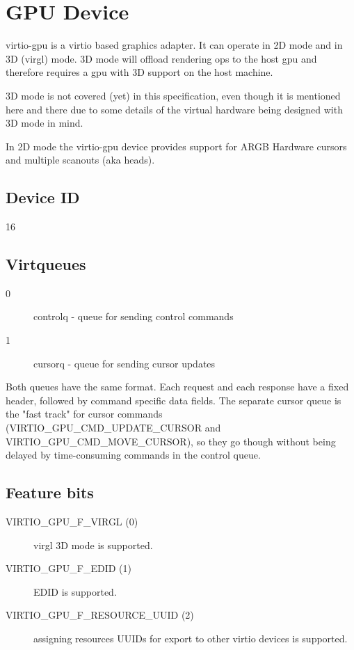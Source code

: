 \section{GPU Device}\label{sec:Device Types / GPU Device}

virtio-gpu is a virtio based graphics adapter.  It can operate in 2D
mode and in 3D (virgl) mode.  3D mode will offload rendering ops to
the host gpu and therefore requires a gpu with 3D support on the host
machine.

3D mode is not covered (yet) in this specification, even though it is
mentioned here and there due to some details of the virtual hardware
being designed with 3D mode in mind.

In 2D mode the virtio-gpu device provides support for ARGB Hardware
cursors and multiple scanouts (aka heads).

\subsection{Device ID}\label{sec:Device Types / GPU Device / Device ID}

16

\subsection{Virtqueues}\label{sec:Device Types / GPU Device / Virtqueues}

\begin{description}
\item[0] controlq - queue for sending control commands
\item[1] cursorq - queue for sending cursor updates
\end{description}

Both queues have the same format.  Each request and each response have
a fixed header, followed by command specific data fields.  The
separate cursor queue is the "fast track" for cursor commands
(VIRTIO_GPU_CMD_UPDATE_CURSOR and VIRTIO_GPU_CMD_MOVE_CURSOR), so they
go though without being delayed by time-consuming commands in the
control queue.

\subsection{Feature bits}\label{sec:Device Types / GPU Device / Feature bits}

\begin{description}
\item[VIRTIO_GPU_F_VIRGL (0)] virgl 3D mode is supported.
\item[VIRTIO_GPU_F_EDID  (1)] EDID is supported.
\item[VIRTIO_GPU_F_RESOURCE_UUID (2)] assigning resources UUIDs for export
  to other virtio devices is supported.
\end{description}


